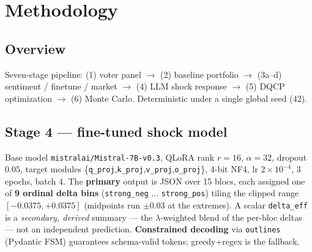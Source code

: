\documentclass[11pt]{article}
\begin{document}
\section{Methodology}
\subsection{Overview}
Seven-stage pipeline: (1) voter panel $\rightarrow$ (2) baseline portfolio
$\rightarrow$ (3a--d) sentiment / finetune / market $\rightarrow$ (4) LLM shock
response $\rightarrow$ (5) DQCP optimization $\rightarrow$ (6) Monte Carlo.
Deterministic under a single global seed (42).

\subsection{Stage 4 --- fine-tuned shock model}\label{sec:stage4}
Base model \texttt{mistralai/Mistral-7B-v0.3}, QLoRA rank $r{=}16$,
$\alpha{=}32$, dropout $0.05$, target modules
\{\texttt{q\_proj},\texttt{k\_proj},\texttt{v\_proj},\texttt{o\_proj}\},
4-bit NF4, lr $2\times10^{-4}$, 3 epochs, batch 4. The \textbf{primary} output is
JSON over 15 blocs, each assigned one of \textbf{9 ordinal delta bins}
(\texttt{strong\_neg} $\dots$ \texttt{strong\_pos}) tiling the clipped range
$[-0.0375,+0.0375]$ (midpoints run $\pm0.03$ at the extremes).
A scalar
\texttt{delta\_eff} is a \emph{secondary, derived} summary --- the
$\lambda$-weighted blend of the per-bloc deltas --- not an independent
prediction. \textbf{Constrained decoding} via \texttt{outlines} (Pydantic
FSM) guarantees schema-valid tokens; greedy+regex is the fallback.
\end{document}

